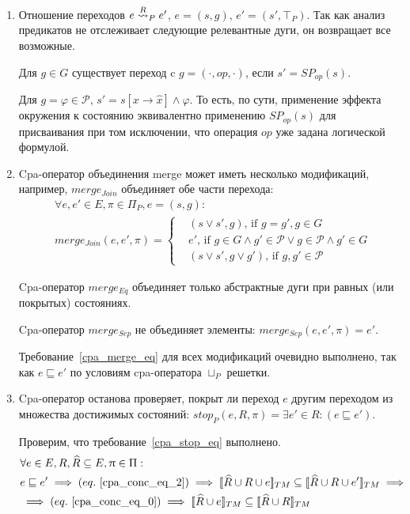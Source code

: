 \begin{enumerate}
\item Отношение переходов $e \stackrel{R}{\leadsto}_P e'$, $e = (s, g)$, $e' = (s', \top_P)$. 
Так как анализ предикатов не отслеживает следующие релевантные дуги, он возвращает все возможные. 

Для $g \in G$ существует переход c $g = (\cdot, op, \cdot)$, если $s' = SP_{op}(s)$.

Для $g = \varphi \in \mathscr{P}$, $s' = s[x \rightarrow \hat x] \land \varphi$.
То есть, по сути, применение эффекта окружения к состоянию эквивалентно применению $SP_{op}(s)$ для присваивания при том исключении, что операция $op$ уже задана логической формулой.

\item 
Cpa-оператор объединения merge может иметь несколько модификаций, например,
$merge_{Join}$ объединяет обе части перехода:
\begin{equation}
\label{predicate_merge_join_def}
\begin{aligned}
& \forall e, e' \in E, \pi \in \Pi_P, e =(s,g): \\
& merge_{Join}(e, e', \pi) = 
\begin{cases}
& (s \lor s', g) \text{, if } g = g', g \in G \\
& e' \text{, if } g \in G \land g' \in \mathscr{P} \lor g \in \mathscr{P} \land g' \in G \\
& (s \lor s', g \lor g') \text{, if } g, g' \in \mathscr{P}
\end{cases}
\end{aligned}
\end{equation}

Cpa-оператор $merge_{Eq}$ объединяет только абстрактные дуги при равных (или покрытых) состояниях.

Cpa-оператор $merge_{Sep}$ не объединяет элементы: $merge_{Sep}(e, e', \pi) = e'$.

Требование~\ref{cpa_merge_eq} для всех модификаций очевидно выполнено, так как $e \sqsubseteq e'$  по условиям cpa-оператора $\sqcup_P$ решетки.

\item Cpa-оператор останова проверяет, покрыт ли переход $e$ другим переходом из множества достижимых состояний: $stop_{P}(e, R, \pi) = \exists e'\in R: (e \sqsubseteq e')$.

Проверим, что требование~\ref{cpa_stop_eq} выполнено.
\begin{align*}
&\forall e \in E, R, \widehat{R} \subseteq E, \pi \in \Pi: \\
& e \sqsubseteq e' \implies (eq.~\ref{cpa_conc_eq_2}) \implies \conctm{\widehat{R} \cup R \cup e} \subseteq \conctm{\widehat{R} \cup R \cup e'} \implies  \\
& \implies (eq.~\ref{cpa_conc_eq_0}) \implies \conctm{\widehat{R} \cup e} \subseteq \conctm{\widehat{R} \cup R} 
\end{align*}


\end{enumerate}

